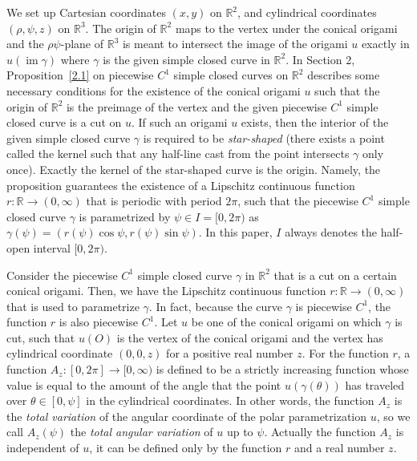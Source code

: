 \documentclass{amsart}
\theoremstyle{plain}
\theoremstyle{definition}
\theoremstyle{remark}
\DeclareMathOperator{\im}{im}
\begin{document}
We set up Cartesian coordinates $(x,y)$ on $\mathbb{R}^2$, and cylindrical coordinates $(\rho,\psi,z)$ on $\mathbb{R}^3$.
The origin of $\mathbb{R}^2$ maps to the vertex under the conical origami 
and the $\rho\psi$-plane of $\mathbb{R}^3$ is meant to intersect the image of the origami $u$ 
exactly in $u(\im\gamma)$ where $\gamma$ is the given simple closed curve in $\mathbb{R}^2$.
In Section 2, Proposition~\ref{2.1} 
on piecewise $C^1$ simple closed curves on $\mathbb{R}^2$
describes some necessary conditions for the existence of the conical origami $u$ 
such that the origin of $\mathbb{R}^2$ is the preimage of the vertex and the given piecewise $C^1$ simple closed curve is a cut on $u$.
If such an origami $u$ exists, then the interior of the given simple closed curve $\gamma$ is required to be \emph{star-shaped} 
(there exists a point called the kernel such that any half-line cast from the point intersects $\gamma$ only once).
Exactly the kernel of the star-shaped curve is the origin.
Namely, the proposition guarantees the existence of a Lipschitz continuous function $r \colon \mathbb{R}\to(0,\infty)$ 
that is periodic with period $2\pi$, such that the piecewise $C^1$ simple closed curve $\gamma$ is parametrized by $\psi\in I=[0,2\pi)$ as $\gamma(\psi)=(r(\psi)\cos\psi,r(\psi)\sin\psi)$.
In this paper, $I$ always denotes the half-open interval $[0,2\pi)$.

Consider the piecewise $C^1$ simple closed curve $\gamma$ in $\mathbb{R}^2$ that is a cut on a certain conical origami.
Then, we have the Lipschitz continuous function $r \colon \mathbb{R}\to(0,\infty)$ that is used to parametrize $\gamma$.
In fact, because the curve $\gamma$ is piecewise $C^1$, the function $r$ is also piecewise $C^1$.
Let $u$ be one of the conical origami on which $\gamma$ is cut, such that $u(O)$ is the vertex of the conical origami and the vertex has cylindrical coordinate $(0,0,z)$ for a positive real number $z$.
For the function $r$, a function $A_z \colon [0,2\pi]\to[0,\infty)$ is defined to be a strictly 
increasing function whose value is equal to the amount of the angle that the point $u(\gamma(\theta))$ has traveled over $\theta\in[0,\psi]$ in the cylindrical coordinates.
In other words, the function $A_z$ is the \emph{total variation} of the angular coordinate of the polar parametrization $u$, so we call $A_z(\psi)$ the \emph{total angular variation} of $u$ up to $\psi$.
Actually the function $A_z$ is independent of $u$, it can be defined only by the function $r$ and a real number $z$.
\end{document}

